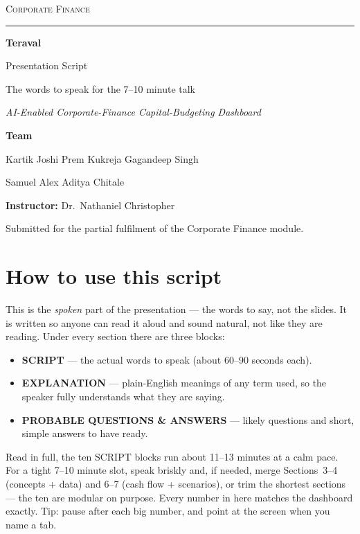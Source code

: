 \documentclass[12pt,a4paper]{article}
\begin{document}
\begin{titlepage}
\centering
\vspace*{1.4cm}
{\large\scshape Corporate Finance\par}
\vspace{0.4cm}
{\rule{0.6\textwidth}{0.4pt}\par}
\vspace{1.4cm}
{\Huge\bfseries Teraval\par}
\vspace{0.5cm}
{\Large Presentation Script\par}
\vspace{0.3cm}
{\large The words to speak for the 7--10 minute talk\par}
\vspace{1.6cm}
{\large\itshape AI-Enabled Corporate-Finance Capital-Budgeting Dashboard\par}
\vspace{2.0cm}
{\large\textbf{Team}\par}
\vspace{0.3cm}
{\large Kartik Joshi \quad Prem Kukreja \quad Gagandeep Singh\par}
{\large Samuel Alex \quad Aditya Chitale\par}
\vspace{1.4cm}
{\large \textbf{Instructor:} Dr.\ Nathaniel Christopher\par}
\vfill
{\small Submitted for the partial fulfilment of the Corporate Finance module.\par}
\end{titlepage}

\section*{How to use this script}
This is the \emph{spoken} part of the presentation --- the words to say, not the slides.
It is written so anyone can read it aloud and sound natural, not like they are reading.
Under every section there are three blocks:
\begin{itemize}
  \item \textcolor{tvblue}{\textbf{SCRIPT}} --- the actual words to speak (about 60--90 seconds each).
  \item \textcolor{tvgreen}{\textbf{EXPLANATION}} --- plain-English meanings of any term used, so the
  speaker fully understands what they are saying.
  \item \textcolor{tvamber}{\textbf{PROBABLE QUESTIONS \& ANSWERS}} --- likely questions and short,
  simple answers to have ready.
\end{itemize}
Read in full, the ten SCRIPT blocks run about 11--13 minutes at a calm pace. For a tight 7--10 minute
slot, speak briskly and, if needed, merge Sections~3--4 (concepts + data) and 6--7 (cash flow +
scenarios), or trim the shortest sections --- the ten are modular on purpose. Every number in here
matches the dashboard exactly. Tip: pause after each big number, and point at the screen when you name
a tab.
\end{document}
